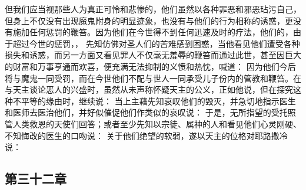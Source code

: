 但我们应当视那些人为真正可怜和悲惨的，他们虽然以各种罪恶和邪恶玷污自己，但身上不仅没有出现魔鬼附身的明显迹象，也没有与他们的行为相称的诱惑，更没有施加任何惩罚的鞭笞。因为他们在今世得不到任何迅速及时的疗法，他们的，由于超过今世的惩罚，， 先知仿佛对圣人们的苦难感到困惑，当他看见他们遭受各种损失和诱惑，而另一方面又看见罪人不仅毫无羞辱的鞭笞而通过此世，甚至因巨大的财富和万事亨通而欢喜，便充满无法抑制的义愤和热忱，喊道： 因为他们今后将与魔鬼一同受罚，而在今世他们不配与世人一同承受儿子份内的管教和鞭笞。在与天主谈论恶人的兴盛时，虽然从未声称怀疑天主的公义，正如他说，但在探究这种不平等的缘由时，继续说：  当上主藉先知哀叹他们的毁灭，并急切地指示医生和医师去医治他们，并好似催促他们作类似的哀叹说： 于是，无所指望的受托照管人类救恩的天使们回答；或者至少先知以宗徒、属神的人和看见他们心灵刚硬、不知悔改的医生的口吻说：  关于他们绝望的软弱，遂以天主的位格对耶路撒冷说： \par


\subsection{第三十二章}

\par


